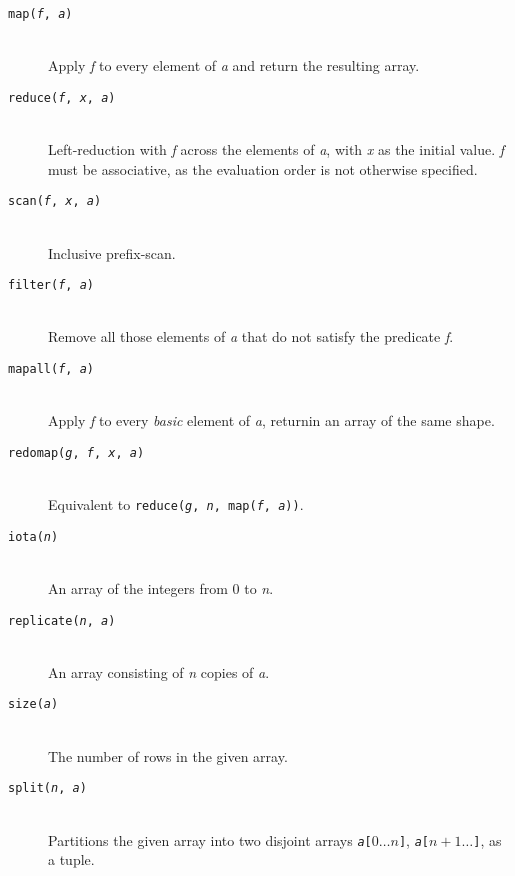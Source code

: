 \documentclass[oneside]{memoir}
\begin{document}
\begin{description}
  \item[\texttt{map(\textit{f}, \textit{a})}]\hfill\\
    Apply \textit{f} to every element of \textit{a} and return the resulting array.

  \item[\texttt{reduce(\textit{f}, \textit{x}, \textit{a})}]\hfill\\
    Left-reduction with \textit{f} across the elements of \textit{a},
    with \textit{x} as the initial value.  \textit{f} must be
    associative, as the evaluation order is not otherwise specified.

  \item[\texttt{scan(\textit{f}, \textit{x}, \textit{a})}]\hfill\\
    Inclusive prefix-scan.

  \item[\texttt{filter(\textit{f}, \textit{a})}]\hfill\\
    Remove all those elements of \textit{a} that do not satisfy the
    predicate \textit{f}.

  \item[\texttt{mapall(\textit{f}, \textit{a})}]\hfill\\
    Apply \textit{f} to every \emph{basic} element of \textit{a},
    returnin an array of the same shape.

  \item[\texttt{redomap(\textit{g}, \textit{f}, \textit{x}, \textit{a})}]\hfill\\
    Equivalent to \texttt{reduce(\textit{g}, \textit{n}, map(\textit{f}, \textit{a}))}.

  \item[\texttt{iota(\textit{n})}]\hfill\\
    An array of the integers from $0$ to \textit{n}.

  \item[\texttt{replicate(\textit{n}, \textit{a})}]\hfill\\
    An array consisting of \textit{n} copies of \textit{a}.

  \item[\texttt{size(\textit{a})}]\hfill\\
    The number of rows in the given array.

  \item[\texttt{split(\textit{n}, \textit{a})}]\hfill\\
    Partitions the given array into two disjoint arrays
    \texttt{\textit{a}[$0\ldots{}n$]}, \texttt{\textit{a}[$n+1\ldots{}$]}, as a tuple.


\end{description}
\end{document}
